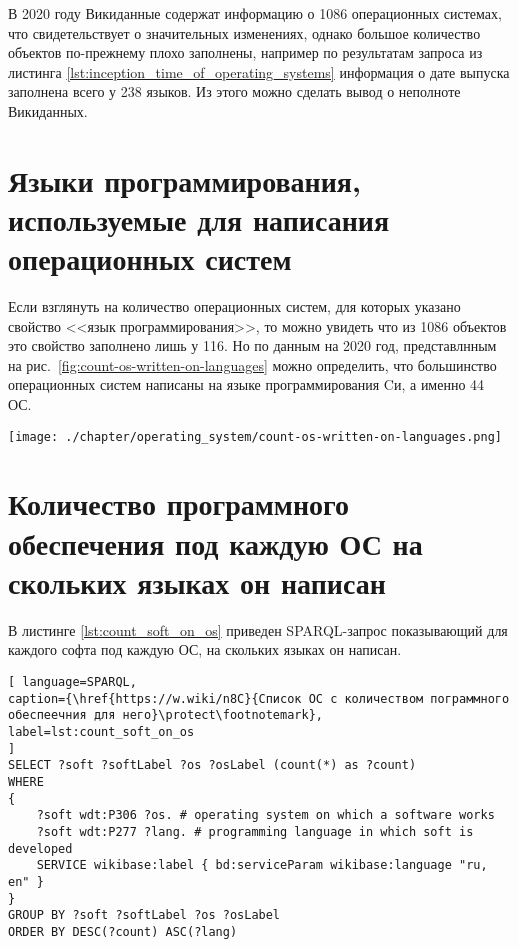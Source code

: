 В 2020 году Викиданные содержат информацию о 1086 операционных системах, что свидетельствует о значительных изменениях, однако большое количество объектов по-прежнему плохо заполнены, например по результатам запроса из листинга \ref{lst:inception_time_of_operating_systems} информация о дате выпуска заполнена всего у \num{238} языков. Из этого можно сделать вывод о неполноте Викиданных.

\section{Языки программирования, используемые для написания операционных систем}
Если взглянуть на количество операционных систем, для которых указано свойство <<язык программирования>>, то можно увидеть что из \num{1086} объектов это свойство заполнено лишь у \num{116}. Но по данным на 2020 год, представлнным на рис.~\ref{fig:count-os-written-on-languages} можно определить, что большинство операционных систем написаны на языке программирования Cи, а именно 44 ОС. 
\begin{figure*}[h!]
	\texttt{[image: ./chapter/operating\_system/count-os-written-on-languages.png]}
	\caption{Количество операционных систем, написанных на языках программирования (данные на 2020 год.)}
	\label{fig:count-os-written-on-languages}
\end{figure*}


\section{Количество программного обеспечения под каждую ОС на скольких языках он написан}
В листинге \ref{lst:count_soft_on_os} приведен SPARQL-запрос показывающий для каждого софта под каждую ОС, на скольких языках он написан.

\begin{lstlisting}[ language=SPARQL, 
caption={\href{https://w.wiki/n8C}{Список ОС с количеством пограммного обеспеечния для него}\protect\footnotemark},
label=lst:count_soft_on_os
]
SELECT ?soft ?softLabel ?os ?osLabel (count(*) as ?count)
WHERE
{
	?soft wdt:P306 ?os. # operating system on which a software works
	?soft wdt:P277 ?lang. # programming language in which soft is developed
	SERVICE wikibase:label { bd:serviceParam wikibase:language "ru, en" }
}
GROUP BY ?soft ?softLabel ?os ?osLabel
ORDER BY DESC(?count) ASC(?lang)
\end{lstlisting}


